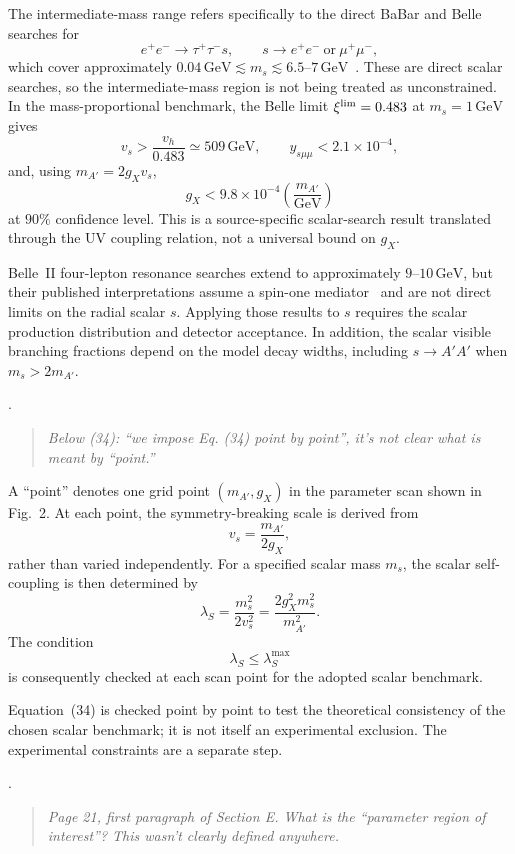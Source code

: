 \documentclass[12pt,a4paper]{article}
\begin{document}
The intermediate-mass range refers specifically to the direct BaBar and Belle searches for
\[
e^+e^-\to\tau^+\tau^-s,\qquad
s\to e^+e^-\ \text{or}\ \mu^+\mu^-,
\]
which cover approximately \(0.04\,\mathrm{GeV}\lesssim m_s\lesssim6.5\text{--}7\,\mathrm{GeV}\)~\cite{BaBar:2020jma,Belle:2022gbl}. These are direct scalar searches, so the intermediate-mass region is not being treated as unconstrained. In the mass-proportional benchmark, the Belle limit \(\xi^{\rm lim}=0.483\) at \(m_s=1\,\mathrm{GeV}\)~\cite{Belle:2022gbl} gives
\[
v_s>\frac{v_h}{0.483}\simeq509\,\mathrm{GeV},
\qquad
y_{s\mu\mu}<2.1\times10^{-4},
\]
and, using \(m_{A'}=2g_Xv_s\),
\[
g_X<9.8\times10^{-4}
\left(\frac{m_{A'}}{\mathrm{GeV}}\right)
\]
at \(90\%\) confidence level. This is a source-specific scalar-search result translated through the UV coupling relation, not a universal bound on \(g_X\).

Belle~II four-lepton resonance searches extend to approximately \(9\text{--}10\,\mathrm{GeV}\), but their published interpretations assume a spin-one mediator~\cite{Belle-II:2024wtd,Belle-II:2023ydz} and are not direct limits on the radial scalar \(s\). Applying those results to \(s\) requires the scalar production distribution and detector acceptance. In addition, the scalar visible branching fractions depend on the model decay widths, including \(s\to A'A'\) when \(m_s>2m_{A'}\).

\medskip
{}. \begin{quote}\itshape
Below (34): ``we impose Eq. (34) point by point'', it's not clear what is meant by ``point.''
\end{quote}

A ``point'' denotes one grid point \((m_{A'},g_X)\) in the parameter scan shown in Fig.~2. At each point, the symmetry-breaking scale is derived from
\[
v_s=\frac{m_{A'}}{2g_X},
\]
rather than varied independently. For a specified scalar mass \(m_s\), the scalar self-coupling is then determined by
\[
\lambda_S
=\frac{m_s^2}{2v_s^2}
=\frac{2g_X^2m_s^2}{m_{A'}^2}.
\]
The condition
\[
\lambda_S\leq\lambda_S^{\max}
\]
is consequently checked at each scan point for the adopted scalar benchmark.

Equation~(34) is checked point by point to test the theoretical consistency of the chosen scalar benchmark; it is not itself an experimental exclusion. The experimental constraints are a separate step.

\medskip
{}. \begin{quote}\itshape
Page 21, first paragraph of Section E. What is the ``parameter region of interest''? This wasn't clearly defined anywhere.
\end{quote}
\end{document}
